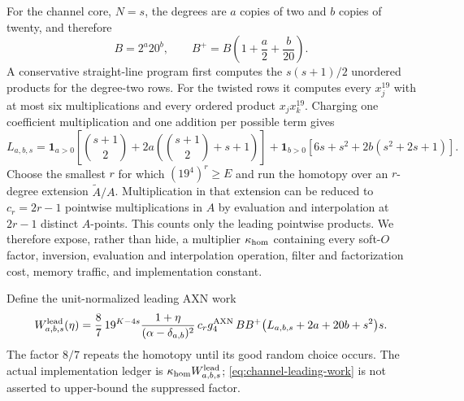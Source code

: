 \documentclass[11pt]{article}
\begin{document}
For the channel core, $N=s$, the degrees are $a$ copies of two and $b$ copies
of twenty, and therefore
\begin{equation}\label{eq:channel-bezout}
 B=2^a20^b,
 \qquad
 B^+=B\left(1+\frac a2+\frac b{20}\right).
\end{equation}
A conservative straight-line program first computes the
$s(s+1)/2$ unordered products for the degree-two rows.  For the twisted rows it
computes every $x_j^{19}$ with at most six multiplications and every ordered
product $x_jx_k^{19}$.  Charging one coefficient multiplication and one
addition per possible term gives
\begin{equation}\label{eq:channel-slp}
 L_{a,b,s}=
 \mathbf1_{a>0}\!\left[\binom{s+1}{2}+2a\left(\binom{s+1}{2}+s+1\right)\right]
 +\mathbf1_{b>0}\!\left[6s+s^2+2b(s^2+2s+1)\right].
\end{equation}
Choose the smallest $r$ for which $(19^4)^r\ge E$ and run the homotopy over an
$r$-degree extension $\widetilde A/A$.  Multiplication in that extension can
be reduced to $c_r=2r-1$ pointwise multiplications in $A$ by evaluation and
interpolation at $2r-1$ distinct $A$-points.  This counts only the leading
pointwise products.  We therefore expose, rather than hide, a multiplier
$\kappa_{\rm hom}$ containing every soft-$O$ factor, inversion, evaluation and
interpolation operation, filter and factorization cost, memory traffic, and
implementation constant.

Define the unit-normalized leading AXN work
\begin{equation}\label{eq:channel-leading-work}
 W^{\rm lead}_{a,b,s}(\eta)=
 \frac{8}{7}\,
 19^{K-4s}\frac{1+\eta}{(\alpha-\delta_{a,b})^2}\,
 c_r g_4^{\rm AXN}\,
 B B^+\bigl(L_{a,b,s}+2a+20b+s^2\bigr)s.
\end{equation}
The factor $8/7$ repeats the homotopy until its good random choice occurs.
The actual implementation ledger is
$\kappa_{\rm hom}W^{\rm lead}_{a,b,s}$; \eqref{eq:channel-leading-work} is not
asserted to upper-bound the suppressed factor.
\end{document}
